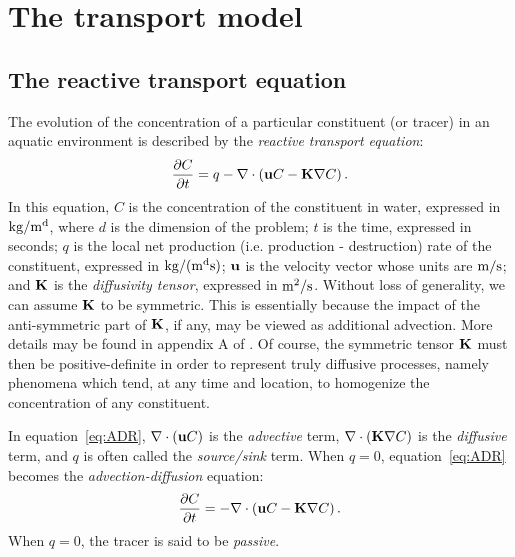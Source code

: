 \chapter{The transport model} \label{chap:transportmodel}
\section{The reactive transport equation}
The evolution of the concentration of a particular constituent (or tracer) in an aquatic environment is described by the \textit{reactive transport equation}:
\begin{equation}\label{eq:ADR}
	\frac{\partial C}{\partial t} = q-\nabla \cdot \left(\b uC - \b K \nabla C\right).
\end{equation}
In this equation, $C$ is the concentration of the constituent in water, expressed in $\rm{kg/m^d}$, where $d$ is the dimension of the problem; $t$ is the time, expressed in seconds; $q$ is the local net production (i.e. production - destruction) rate of the constituent, expressed in $\rm{kg/(m^ds)}$; $\b u$ is the velocity vector whose units are $\rm{m/s}$; and $\b K$ is the \textit{diffusivity tensor}, expressed in $\rm{m^2/s}$. Without loss of generality, we can assume $\b K$ to be symmetric. This is essentially because the impact of the anti-symmetric part of $\b K$, if any, may be viewed as additional advection. More details may be found in appendix A of \cite{deleersnijder2001concept}. Of course, the symmetric tensor $\b K$ must then be positive-definite in order to represent truly diffusive processes, namely phenomena which tend, at any time and location, to homogenize the concentration of any constituent.

In equation~\eqref{eq:ADR}, $\nabla \cdot (\b u C)$ is the \textit{advective} term, $\nabla \cdot (\b K \nabla C)$ is the \textit{diffusive} term, and $q$ is often called the \textit{source/sink} term. When $q=0$, equation~\eqref{eq:ADR} becomes the \textit{advection-diffusion} equation:
\begin{equation}\label{eq:C_PDE_vec}
 	\frac{\partial C}{\partial t} = -\nabla \cdot \left(\b uC - \b K \nabla C\right).
 \end{equation}
 When $q=0$, the tracer is said to be \textit{passive}.

